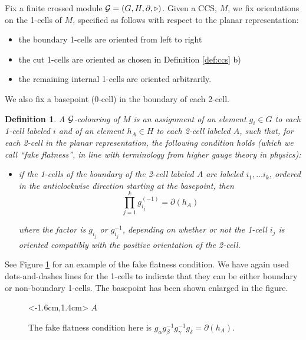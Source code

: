 \documentclass[a4paper,11pt]{article}
\newtheorem{Definition}[Theorem]{Definition}
\begin{document}
Fix a finite crossed module ${\cal G} = (G,H, \partial, \triangleright)$. Given a CCS, $M$, we fix orientations on the 1-cells of $M$, specified as follows with respect to the planar representation:

\begin{itemize}

\item the boundary 1-cells are oriented from left to right
\item the cut 1-cells are oriented as chosen in Definition \ref{def:ccs} b)
\item the remaining internal 1-cells are oriented arbitrarily.

\end{itemize}

We also fix a basepoint (0-cell) in the boundary of each 2-cell.

\begin{Definition} A $\cal G$-colouring of $M$ is an assignment of an element $g_i\in G$ to each 1-cell labeled $i$ and of an element $h_A \in H$ to each 2-cell labeled $A$, such that, for each 2-cell in the planar representation, the following condition holds (which we call ``fake flatness'', in line with terminology from higher gauge theory in physics):

\begin{itemize}

\item if the 1-cells of the boundary of the 2-cell labeled $A$ are labeled $i_1, \dots i_k$, ordered in the anticlockwise direction starting at the basepoint, then
\begin{equation}
\prod_{j=1}^k g_{i_j}^{(-1)} = \partial(h_A)
\end{equation} 

where the factor is $g_{i_j}$ or $g_{i_j}^{-1}$, depending on whether or not the 1-cell $i_j$ is oriented compatibly with the positive orientation of the 2-cell.

\end{itemize}

\end{Definition}



See Figure \ref{fig:connection} for an example of the fake flatness condition. We have again used dots-and-dashes lines for the 1-cells to indicate that they can be either boundary or non-boundary 1-cells. The basepoint has been shown enlarged in the figure.

\begin{figure}[htbp] 
\centerline{\relabelbox 
\epsfxsize 3cm
\extralabel <-1.6cm,1.4cm> {$A$}
\endrelabelbox}
\caption{The fake flatness condition here is $g_\alpha g_\beta^{-1}g_\gamma^{-1}g_\delta =\partial (h_A)$.}
\label{fig:connection}
\end{figure}
\end{document}
